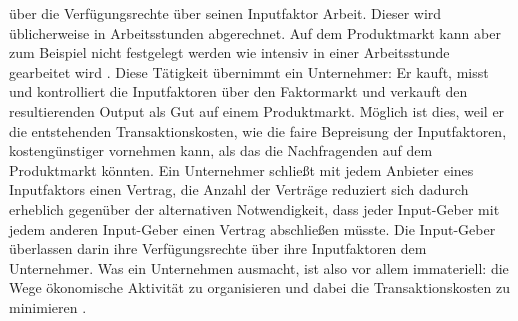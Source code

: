 über die Verfügungsrechte über seinen Inputfaktor Arbeit. Dieser wird üblicherweise in Arbeitsstunden abgerechnet. Auf dem Produktmarkt kann aber zum Beispiel nicht festgelegt werden wie intensiv in einer Arbeitsstunde gearbeitet wird \parencite[S. 5]{Cheung1983}. Diese Tätigkeit übernimmt ein Unternehmer: Er kauft, misst und kontrolliert die Inputfaktoren über den Faktormarkt und verkauft den resultierenden Output als Gut auf einem Produktmarkt. Möglich ist dies, weil er die entstehenden Transaktionskosten, wie die faire Bepreisung der Inputfaktoren, kostengünstiger vornehmen kann, als das die Nachfragenden auf dem Produktmarkt könnten. Ein Unternehmer schließt mit jedem Anbieter eines Inputfaktors einen Vertrag, die Anzahl der Verträge reduziert sich dadurch erheblich gegenüber der alternativen Notwendigkeit, dass jeder Input-Geber mit jedem anderen Input-Geber einen Vertrag abschließen müsste. Die Input-Geber überlassen darin ihre Verfügungsrechte über ihre Inputfaktoren dem Unternehmer. Was ein Unternehmen ausmacht, ist also vor allem immateriell: die Wege ökonomische Aktivität zu organisieren und dabei die Transaktionskosten zu minimieren \parencite[S. 10]{Cheung1983}. 

